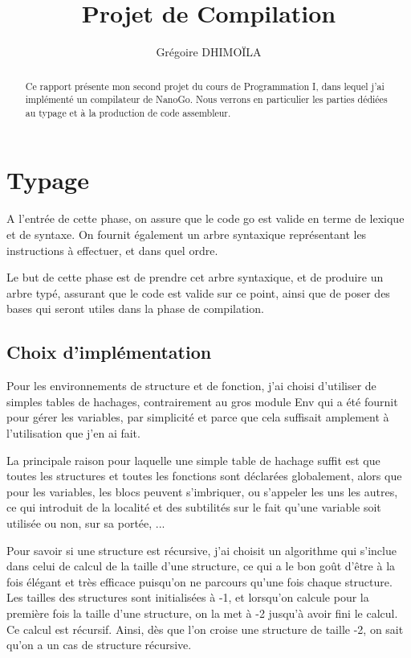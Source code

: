\documentclass{article}
\title{Projet de Compilation}
\author{Grégoire DHIMOÏLA}
\begin{document}
\maketitle

\begin{abstract}
Ce rapport présente mon second projet du cours de Programmation I, dans lequel j'ai implémenté un compilateur de NanoGo. Nous verrons en particulier les parties dédiées au typage et à la production de code assembleur.
\end{abstract}

\section{Typage}

A l'entrée de cette phase, on assure que le code go est valide en terme de lexique et de syntaxe. On fournit également un arbre syntaxique représentant les instructions à effectuer, et dans quel ordre.

Le but de cette phase est de prendre cet arbre syntaxique, et de produire un arbre typé, assurant que le code est valide sur ce point, ainsi que de poser des bases qui seront utiles dans la phase de compilation. 

\subsection{Choix d'implémentation}

Pour les environnements de structure et de fonction, j'ai choisi d'utiliser de simples tables de hachages, contrairement au gros module Env qui a été fournit pour gérer les variables, par simplicité et parce que cela suffisait amplement à l'utilisation que j'en ai fait.

La principale raison pour laquelle une simple table de hachage suffit est que toutes les structures et toutes les fonctions sont déclarées globalement, alors que pour les variables, les blocs peuvent s'imbriquer, ou s'appeler les uns les autres, ce qui introduit de la localité et des subtilités sur le fait qu'une variable soit utilisée ou non, sur sa portée, ...\newline

Pour savoir si une structure est récursive, j'ai choisit un algorithme qui s'inclue dans celui de calcul de la taille d'une structure, ce qui a le bon goût d'être à la fois élégant et très efficace puisqu'on ne parcours qu'une fois chaque structure. Les tailles des structures sont initialisées à -1, et lorsqu'on calcule pour la première fois la taille d'une structure, on la met à -2 jusqu'à avoir fini le calcul. Ce calcul est récursif. Ainsi, dès que l'on croise une structure de taille -2, on sait qu'on a un cas de structure récursive.
\end{document}
